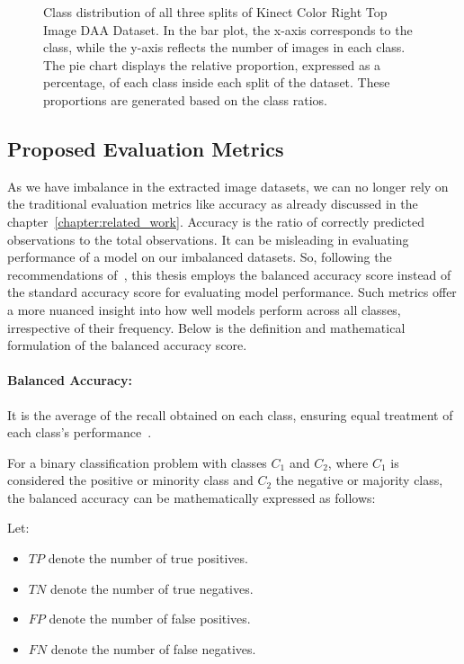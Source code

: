 \begin{figure}[htbp]
    \caption[Class distribution of all three splits of Kinect Color Right Top Image DAA Dataset.]{Class distribution of all three splits of Kinect Color Right Top Image DAA Dataset. In the bar plot, the x-axis corresponds to the class, while the y-axis reflects the number of images in each class. The pie chart displays the relative proportion, expressed as a percentage, of each class inside each split of the dataset. These proportions are generated based on the class ratios.}
    \label{fig:Class_dist_whole_grid_Kinect_color}
\end{figure}

\subsection{Proposed Evaluation Metrics}
As we have imbalance in the extracted image datasets, we can no longer rely on the traditional evaluation metrics like accuracy as already discussed in the chapter~\ref{chapter:related_work}. Accuracy is the ratio of correctly predicted observations to the total observations. It can be misleading in evaluating performance of a model on our imbalanced datasets. So, following the recommendations of~\citet{Survey_DL_Taghi_article, 18_wang2016training}, this thesis employs the balanced accuracy score instead of the standard accuracy score for evaluating model performance. Such metrics offer a more nuanced insight into how well models perform across all classes, irrespective of their frequency. Below is the definition and mathematical formulation of the balanced accuracy score. 

\paragraph{Balanced Accuracy:}
It is the average of the recall obtained on each class, ensuring equal treatment of each class's performance~\citep{bal_acc_paper_brodersen2010balanced, bal_acc_2_sk_learn_kelleher2015fundamentals}. 

For a binary classification problem with classes \( C_1 \) and \( C_2 \), where \( C_1 \) is considered the positive or minority class and \( C_2 \) the negative or majority class, the balanced accuracy can be mathematically expressed as follows:

Let:
\begin{itemize}
    \item \( TP \) denote the number of true positives.
    \item \( TN \) denote the number of true negatives.
    \item \( FP \) denote the number of false positives.
    \item \( FN \) denote the number of false negatives.
\end{itemize}

